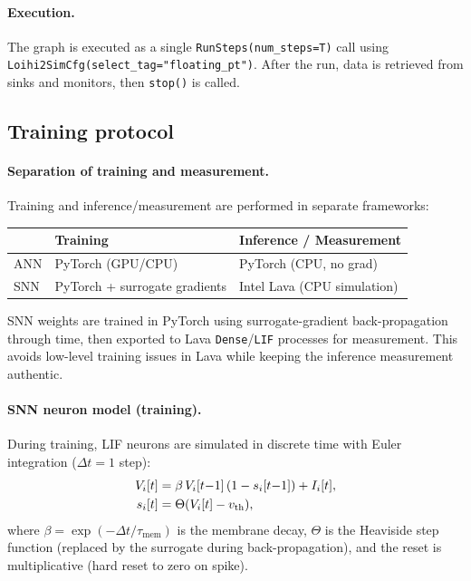 \documentclass[11pt,a4paper]{article}
\begin{document}
\paragraph{Execution.}
The graph is executed as a single \texttt{RunSteps(num\_steps=T)} call
using \texttt{Loihi2SimCfg(select\_tag="floating\_pt")}.  After the run,
data is retrieved from sinks and monitors, then \texttt{stop()} is
called.

\subsection{Training protocol}\label{sec:training}

\paragraph{Separation of training and measurement.}
Training and inference/measurement are performed in separate frameworks:

\begin{center}
\begin{tabular}{@{}lll@{}}
\toprule
& \textbf{Training} & \textbf{Inference / Measurement} \\
\midrule
ANN & PyTorch (GPU/CPU) & PyTorch (CPU, no grad) \\
SNN & PyTorch + surrogate gradients & Intel Lava (CPU simulation) \\
\bottomrule
\end{tabular}
\end{center}

SNN weights are trained in PyTorch using surrogate-gradient
back-propagation through time, then exported to Lava
\texttt{Dense}/\texttt{LIF} processes for measurement.  This avoids
low-level training issues in Lava while keeping the inference
measurement authentic.

\paragraph{SNN neuron model (training).}\label{sec:snn-neuron}
During training, LIF neurons are simulated in discrete time with
Euler integration ($\Delta t = 1$ step):
\begin{align}\label{eq:lif-discrete}
  V_i[t] &= \beta\, V_i[t{-}1]\,(1-s_i[t{-}1]) + I_i[t], \\
  s_i[t]  &= \Theta(V_i[t] - v_{\text{th}}), \notag
\end{align}
where $\beta = \exp(-\Delta t / \tau_{\text{mem}})$ is the membrane
decay, $\Theta$ is the Heaviside step function (replaced by the
surrogate during back-propagation), and the reset is multiplicative
(hard reset to zero on spike).
\end{document}
